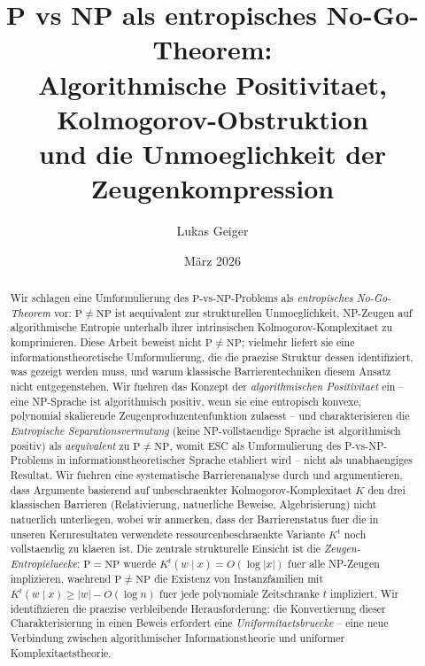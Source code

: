 \documentclass[aps,prd,twocolumn,superscriptaddress,nofootinbib]{revtex4-2}
\theoremstyle{definition}
\theoremstyle{remark}
\newcommand{\NP}{\mathrm{NP}}
\newcommand{\PP}{\mathrm{P}}
\begin{document}

\title{P vs NP als entropisches No-Go-Theorem:\\Algorithmische Positivitaet, Kolmogorov-Obstruktion\\und die Unmoeglichkeit der Zeugenkompression}

\author{Lukas Geiger}

\date{M\"arz 2026}

\begin{abstract}
Wir schlagen eine Umformulierung des $\PP$-vs-$\NP$-Problems als \textit{entropisches No-Go-Theorem} vor: $\PP \neq \NP$ ist aequivalent zur strukturellen Unmoeglichkeit, NP-Zeugen auf algorithmische Entropie unterhalb ihrer intrinsischen Kolmogorov-Komplexitaet zu komprimieren. Diese Arbeit beweist nicht $\PP \neq \NP$; vielmehr liefert sie eine informationstheoretische Umformulierung, die die praezise Struktur dessen identifiziert, was gezeigt werden muss, und warum klassische Barrierentechniken diesem Ansatz nicht entgegenstehen. Wir fuehren das Konzept der \textit{algorithmischen Positivitaet} ein -- eine NP-Sprache ist algorithmisch positiv, wenn sie eine entropisch konvexe, polynomial skalierende Zeugenproduzentenfunktion zulaesst -- und charakterisieren die \textit{Entropische Separationsvermutung} (keine NP-vollstaendige Sprache ist algorithmisch positiv) als \textit{aequivalent} zu $\PP \neq \NP$, womit ESC als Umformulierung des P-vs-NP-Problems in informationstheoretischer Sprache etabliert wird -- nicht als unabhaengiges Resultat. Wir fuehren eine systematische Barrierenanalyse durch und argumentieren, dass Argumente basierend auf unbeschraenkter Kolmogorov-Komplexitaet $K$ den drei klassischen Barrieren (Relativierung, natuerliche Beweise, Algebrisierung) nicht natuerlich unterliegen, wobei wir anmerken, dass der Barrierenstatus fuer die in unseren Kernresultaten verwendete ressourcenbeschraenkte Variante $K^t$ noch vollstaendig zu klaeren ist. Die zentrale strukturelle Einsicht ist die \textit{Zeugen-Entropieluecke}: $\PP = \NP$ wuerde $K^t(w \mid x) = O(\log|x|)$ fuer alle NP-Zeugen implizieren, waehrend $\PP \neq \NP$ die Existenz von Instanzfamilien mit $K^t(w \mid x) \geq |w| - O(\log n)$ fuer jede polynomiale Zeitschranke $t$ impliziert. Wir identifizieren die praezise verbleibende Herausforderung: die Konvertierung dieser Charakterisierung in einen Beweis erfordert eine \textit{Uniformitaetsbruecke} -- eine neue Verbindung zwischen algorithmischer Informationstheorie und uniformer Komplexitaetstheorie.
\end{abstract}
\end{document}
